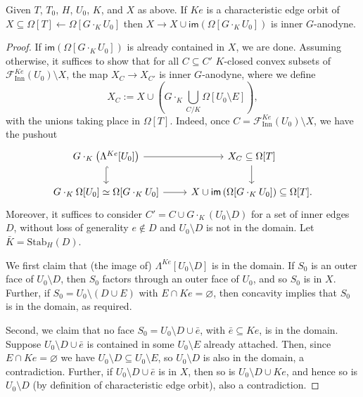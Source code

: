 \documentclass[a4paper,10p,draft]{article}%
\numberwithin{equation}{section}%
\begin{document}
\begin{proposition}
      \label{CHAR_HORN_PROP}
      Given $T$, $T_0$, $H$, $U_0$, $K$, and $X$ as above.
      If $K e$ is a characteristic edge orbit of $X \subseteq \Omega[T] \leftarrow \Omega[G \cdot_K U_0]$
      then $X \to X \cup \mathsf{im}\left(\Omega[G \cdot_K U_0] \right)$ is inner $G$-anodyne.
\end{proposition}
\begin{proof}
      If $\mathsf{im}(\Omega[G \cdot_K U_0])$ is already contained in $X$, we are done.
      Assuming otherwise, it suffices to show that for all
      $C \subseteq C'$ $K$-closed convex subsets of $\mathscr{F}_{\mathrm{Inn}}^{K e}(U_0) \setminus X$, the map
      $X_C \to X_{C'}$ is inner $G$-anodyne, where we define
      \begin{equation}
            X_C := X \cup \left( G \cdot_K \mathop{\bigcup}\limits_{C/K} \Omega[U_0 \setminus E] \right),
      \end{equation}
      with the unions taking place in $\Omega[T]$.
      Indeed, once $C = \mathscr{F}_{\mathrm{Inn}}^{K e}(U_0) \setminus X$, we have the pushout
      \begin{equation}
            \begin{tikzcd}
                  G \cdot_K \left( \Lambda^{K e}[U_0] \right) \arrow[d, hookrightarrow] \arrow[r]
                  &
                  X_C \subseteq \Omega[T] \arrow[d]
                  \\
                  G \cdot_K \Omega[U_0] \simeq \Omega[G \cdot_K U_0] \arrow[r]
                  &
                  X \cup \mathsf{im}\left(\Omega[G \cdot_K U_0]\right) \subseteq \Omega[T].
            \end{tikzcd}
      \end{equation}
      Moreover, it suffices to consider $C' = C \cup G\cdot_K(U_0 \setminus D)$ for a set of inner edges $D$,
      without loss of generality $e \not\in D$ and $U_0 \setminus D$ is not in the domain.
      Let $\bar K = \mathrm{Stab}_H(D)$.

      We first claim that (the image of) $\Lambda^{K e}[U_0 \setminus D]$ is in the domain.
      If $S_0$ is an outer face of $U_0 \setminus D$, then
      $S_0$ factors through an outer face of $U_0$, and so $S_0$ is in $X$.
      Further, if $S_0 = U_0 \setminus (D \cup E)$ with $E \cap K e = \varnothing$,
      then concavity implies that $S_0$ is in the domain, as required.

      Second, we claim that no face $S_0 = U_0 \setminus D \cup \bar e$, with $\bar e \subseteq K e$, is in the domain.
      Suppose $U_0 \setminus D \cup \bar e$ is contained in some $U_0 \setminus E$ already attached.
      Then, since $E \cap K e = \varnothing$ we have $U_0 \setminus D \subseteq U_0 \setminus E$, so
      $U_0 \setminus D$ is also in the domain, a contradiction.
      Further, if $U_0 \setminus D \cup \bar e$ is in $X$, then so is $U_0 \setminus D \cup K e$, and hence
      so is $U_0 \setminus D$ (by definition of characteristic edge orbit), also a contradiction.


\end{proof}
\end{document}
